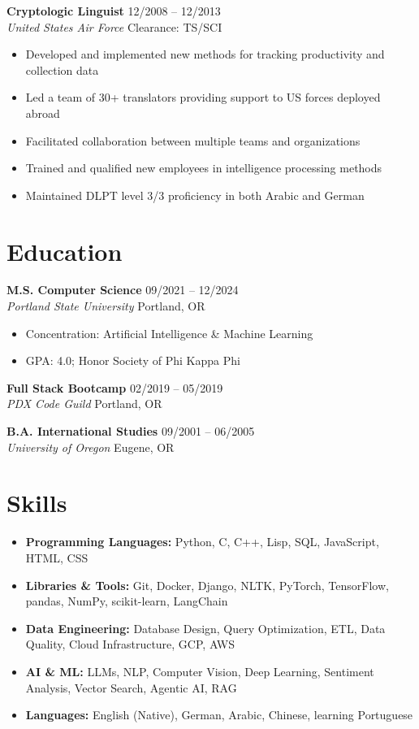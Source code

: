 \documentclass[letterpaper,11pt]{article}
\newcommand{\entry}[4]{
  \vspace{0.1em}
  \noindent\textbf{#1} \hfill #2
  \\ \textit{#3} \hfill #4
  \vspace{0.3em}
}
\newcommand{\achievement}[1]{
  \vspace{-.5em}
  \item #1
}
\begin{document}
\entry{Cryptologic Linguist}{12/2008 -- 12/2013}{United States Air Force}{Clearance: TS\hspace{.1em}/\hspace{.03em}SCI}
\begin{itemize}[leftmargin=*]
  \achievement{Developed and implemented new methods for tracking productivity and collection data}
  \achievement{Led a team of 30+ translators providing support to US forces deployed abroad}
  \achievement{Facilitated collaboration between multiple teams and organizations}
  \achievement{Trained and qualified new employees in intelligence processing methods}
  \achievement{Maintained DLPT level 3/3 proficiency in both Arabic and German}
\end{itemize}
\vspace{-.3cm}

\section{Education}

\entry{M.S. Computer Science}{09/2021 -- 12/2024}{Portland State University}{Portland, OR}
\vspace{-.1cm}
\begin{itemize}[leftmargin=*]
  \achievement{Concentration: Artificial Intelligence \& Machine Learning}
  \achievement{GPA: 4.0; Honor Society of Phi Kappa Phi}
\end{itemize}

\entry{Full Stack Bootcamp}{02/2019 -- 05/2019}{PDX Code Guild}{Portland, OR}

\entry{B.A. International Studies}{09/2001 -- 06/2005}{University of Oregon}{Eugene, OR}
\vspace{-.3cm}

\section{Skills}
\begin{itemize}[leftmargin=*, itemsep=-0.2em]
  \item \textbf{Programming Languages:} Python, C, C++, Lisp, SQL, JavaScript, HTML, CSS
  \item \textbf{Libraries \& Tools:} Git, Docker, Django, NLTK, PyTorch, TensorFlow, pandas, NumPy, scikit-learn, LangChain
  \item \textbf{Data Engineering:} Database Design, Query Optimization, ETL, Data Quality, Cloud Infrastructure, GCP, AWS
  \item \textbf{AI \& ML:} LLMs, NLP, Computer Vision, Deep Learning, Sentiment Analysis, Vector Search, Agentic AI, RAG
  \item \textbf{Languages:} English (Native), German, Arabic, Chinese, learning Portuguese
\end{itemize}
 
\end{document}

